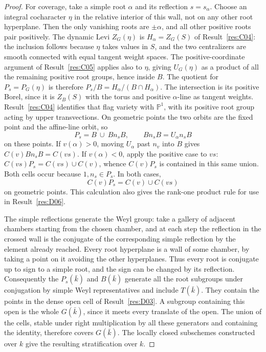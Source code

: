\documentclass[11pt,a4paper,openany,oneside]{book}
\theoremstyle{resultstyle}
\theoremstyle{definition}
\numberwithin{equation}{chapter}
\begin{document}
\begin{proof}
For coverage, take a simple root \(\alpha\) and its
reflection \(s=s_\alpha\). Choose an integral cocharacter
\(\eta\) in the relative interior of this wall, not on any
other root hyperplane. Then the only vanishing roots are
\(\pm\alpha\), and all other positive roots pair positively.
The dynamic Levi \(Z_G(\eta)\) is \(H_\alpha=Z_G(S)\) of
Result~\ref{res:C04}: the inclusion follows because
\(\eta\) takes values in \(S\), and the two centralizers are
smooth connected with equal tangent weight spaces. The
positive-coordinate argument of Result~\ref{res:C05} applies
also to \(\eta\), giving \(U_G(\eta)\) as a product of all
the remaining positive root groups, hence inside \(B\).
The quotient for \(P_s=P_G(\eta)\) is therefore
\(P_s/B=H_\alpha/(B\cap H_\alpha)\).
The intersection is its positive Borel, since it is
\(Z_B(S)\) with the torus and positive \(\alpha\)-line as
tangent weights. Result~\ref{res:C04} identifies that flag
variety with \(\mathbb P^1\), with its positive root group
acting by upper transvections. On geometric points the two
orbits are the fixed point and the affine-line orbit, so
\[
 P_s=B\ \cup\ Bn_sB,\qquad Bn_sB=U_\alpha n_sB
\]
on these points. If \(v(\alpha)>0\), moving \(U_\alpha\)
past \(n_v\) into \(B\) gives \(C(v)Bn_sB=C(vs)\).
If \(v(\alpha)<0\), apply the positive case to \(vs\):
\(C(vs)P_s=C(vs)\cup C(v)\), whence \(C(v)P_s\) is
contained in this same union. Both cells occur because
\(1,n_s\in P_s\). In both cases,
\[
 C(v)P_s=C(v)\cup C(vs)
\]
on geometric points. This calculation also gives the
rank-one product rule for use in Result~\ref{res:D06}.

The simple reflections generate the Weyl group: take a
gallery of adjacent chambers starting from the chosen chamber,
and at each step the reflection in the crossed wall is the
conjugate of the corresponding simple reflection by the
element already reached. Every root hyperplane is a wall
of some chamber, by taking a point on it avoiding the other
hyperplanes. Thus every root is conjugate up to sign to a
simple root, and the sign can be changed by its reflection.
Consequently the \(P_s(\bar k)\) and \(B(\bar k)\) generate
all the root subgroups under conjugation by simple Weyl
representatives and include \(T(\bar k)\). They contain
the points in the dense open cell of Result~\ref{res:D03}.
A subgroup containing this open is the whole \(G(\bar k)\),
since it meets every translate of the open. The union of
the cells, stable under right multiplication by all these
generators and containing the identity, therefore covers
\(G(\bar k)\). The locally closed subschemes constructed over
\(k\) give the resulting stratification over \(k\).


\end{proof}
\end{document}
